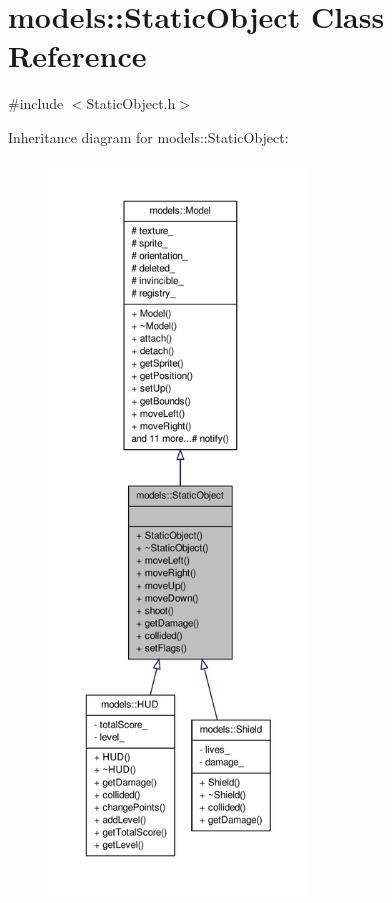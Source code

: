 \hypertarget{classmodels_1_1StaticObject}{\section{models\-:\-:\-Static\-Object \-Class \-Reference}
\label{dc/d3c/classmodels_1_1StaticObject}
}


{\ttfamily \#include $<$\-Static\-Object.\-h$>$}



\-Inheritance diagram for models\-:\-:\-Static\-Object\-:
\nopagebreak
\begin{figure}[H]
\begin{center}
\leavevmode
\includegraphics[height=550pt]{d7/db1/classmodels_1_1StaticObject__inherit__graph}
\end{center}
\end{figure}


